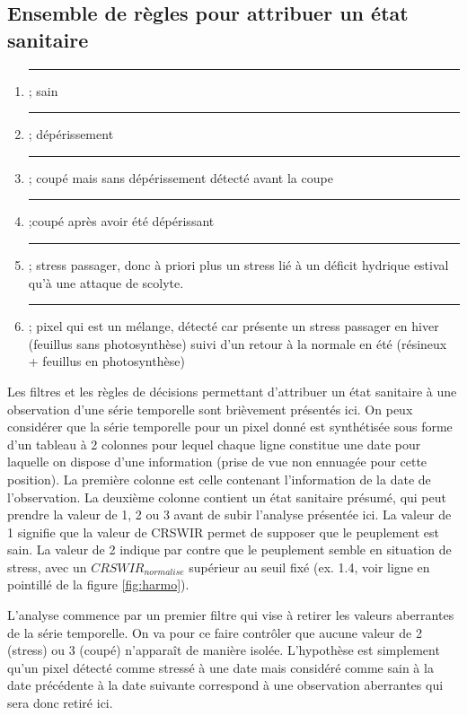 \documentclass[a4paper, 12pt]{article} %
\newcommand\crule[3][black]{\textcolor{#1}{\rule{#2}{#3}}}
\begin{document}
\subsection{Ensemble de règles pour attribuer un état sanitaire}\label{subsec:ES}

\begin{enumerate}

	\item \crule[cl1]{1cm}{1cm} ; sain 

	\item \crule[cl2]{1cm}{1cm} ; dépérissement 

	\item \crule[cl3]{1cm}{1cm} ; coupé mais sans dépérissement détecté avant la coupe 

	\item  \crule[cl4]{1cm}{1cm} ;coupé après avoir été dépérissant
	\item \crule[cl5]{1cm}{1cm} ; stress passager, donc à priori plus un stress lié à un déficit hydrique estival qu'à une attaque de scolyte. 
	\item \crule[cl6]{1cm}{1cm} ; pixel qui est un mélange, détecté car présente un stress passager en hiver (feuillus sans photosynthèse) suivi d'un retour à la normale en été (résineux + feuillus en photosynthèse) 
\end{enumerate}

Les filtres et les règles de décisions permettant d'attribuer un état sanitaire à une observation d'une série temporelle sont brièvement présentés ici. On peux considérer que la série temporelle pour un pixel donné est synthétisée sous forme d'un tableau à 2 colonnes pour lequel chaque ligne constitue une date pour laquelle on dispose d'une information (prise de vue non ennuagée pour cette position). La première colonne est celle contenant l'information de la date de l'observation. La deuxième colonne contient un état sanitaire présumé, qui peut prendre la valeur de 1, 2 ou 3 avant de subir l'analyse présentée ici. La valeur de 1 signifie que la valeur de CRSWIR permet de supposer que le peuplement est sain. La valeur de 2 indique par contre que le peuplement semble en situation de stress, avec un $CRSWIR_{normalise}$ supérieur au seuil fixé (ex. 1.4, voir ligne en pointillé de la figure \ref{fig:harmo}).

L'analyse commence par un premier filtre qui vise à retirer les valeurs aberrantes de la série temporelle. On va pour ce faire contrôler que aucune valeur de 2 (stress) ou 3 (coupé) n'apparaît de manière isolée. L'hypothèse est simplement qu'un pixel détecté comme stressé à une date mais considéré comme sain à la date précédente à la date suivante correspond à une observation aberrantes qui sera donc retiré ici.
\end{document}
